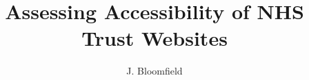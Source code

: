 \documentclass[12pt]{third-rep}
\title{Assessing Accessibility of NHS Trust Websites}
\author{J. Bloomfield}
\begin{document}
\setlength{\headheight}{15pt}
\addtolength{\topmargin}{-15pt}

\dotitleandabstract\

\tableofcontents
\listoffigures
\listoftables









~\cite{Abascal2019ToolsFW} %




\appendix

\end{document}
